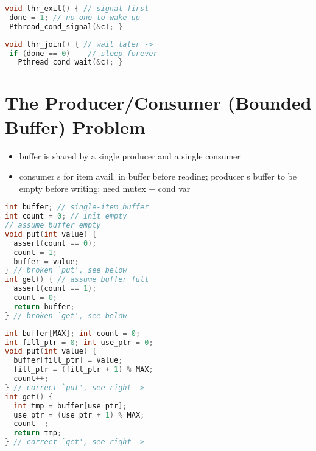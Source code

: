 \begin{minipage}{.5\linewidth}
\begin{lstlisting}[language=c,xrightmargin=2pt]
void thr_exit() { // signal first
 done = 1; // no one to wake up
 Pthread_cond_signal(&c); }
\end{lstlisting}
\end{minipage}
\begin{minipage}{.5\linewidth}
\begin{lstlisting}[language=c,xleftmargin=2pt]
void thr_join() { // wait later ->
 if (done == 0)    // sleep forever
   Pthread_cond_wait(&c); }
\end{lstlisting}
\end{minipage}
\section*{The Producer/Consumer (Bounded Buffer) Problem}
\begin{itemize}
\item buffer is shared by a single producer and a single consumer
\item consumer s for item avail. in buffer before reading; producer s buffer to be empty before writing: need mutex + cond var
\end{itemize}
\begin{minipage}{.5\linewidth}
\begin{lstlisting}[language=c,xleftmargin=0pt,xrightmargin=2pt,frame=lines]
int buffer; // single-item buffer
int count = 0; // init empty
// assume buffer empty
void put(int value) {
  assert(count == 0);
  count = 1;
  buffer = value;
} // broken `put', see below
int get() { // assume buffer full
  assert(count == 1);
  count = 0;
  return buffer;
} // broken `get', see below
\end{lstlisting}
\end{minipage}
\begin{minipage}{.5\linewidth}
\begin{lstlisting}[language=c,xleftmargin=2pt,xrightmargin=2pt,frame=lines]
int buffer[MAX]; int count = 0;
int fill_ptr = 0; int use_ptr = 0;
void put(int value) {
  buffer[fill_ptr] = value;
  fill_ptr = (fill_ptr + 1) % MAX;
  count++;
} // correct `put', see right ->
int get() {
  int tmp = buffer[use_ptr];
  use_ptr = (use_ptr + 1) % MAX;
  count--;
  return tmp;
} // correct `get', see right ->
\end{lstlisting}
\end{minipage}

